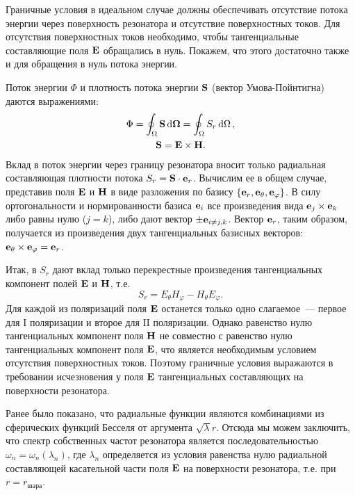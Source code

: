 \documentclass[12pt,a4paper]{article}
\begin{document}
        Граничные условия в идеальном случае должны обеспечивать отсутствие потока энергии через поверхность резонатора и отсутствие поверхностных токов. Для отсутствия поверхностных токов необходимо, чтобы тангенциальные составляющие поля $\vb{E}$ обращались в нуль. Покажем, что этого достаточно также и для обращения в нуль потока энергии.

        Поток энергии $\Phi$ и плотность потока энергии $\vb{S}$ (вектор Умова-Пойнтигна) даются выражениями:
        \begin{equation}\begin{gathered}
            \Phi = \oint_\Omega \vb{S} \dd{\vb{\Omega}}
                 = \oint_\Omega S_r \dd{\Omega} , \\
            \vb{S} = \vb{E} \times \vb{H} .
        \end{gathered}\end{equation}
        Вклад в поток энергии через границу резонатора вносит только радиальная составляющая плотности потока $S_r = \vb{S} \cdot \vb{e}_r$. Вычислим ее в общем случае, представив поля $\vb{E}$ и $\vb{H}$ в виде разложения по базису $\qty{ \vb{e}_r, \vb{e}_\theta, \vb{e}_\varphi }$. В силу ортогональности и нормированности базиса $\vb{e}_i$ все произведения вида $\vb{e}_j \times \vb{e}_k$ либо равны нулю ($j = k$), либо дают вектор $\pm \vb{e}_{i \neq j,k}$. Вектор $\vb{e}_r$, таким образом, получается из произведения двух тангенциальных базисных векторов: $\vb{e}_\theta \times \vb{e}_\varphi = \vb{e}_r$.

        Итак, в $S_r$ дают вклад только перекрестные произведения тангенциальных компонент полей $\vb{E}$ и $\vb{H}$, т.е.
        \begin{equation}
            S_r = E_\theta H_\varphi - H_\theta E_\varphi .
        \end{equation}
        Для каждой из поляризаций поля $\vb{E}$ останется только одно слагаемое~--- первое для $\mathrm{I}$ поляризации и второе для $\mathrm{II}$ поляризации. Однако равенство нулю тангенциальных компонент поля $\vb{H}$ не совместно с равенство нулю тангенциальных компонент поля $\vb{E}$, что является необходимым условием отсутствия поверхностных токов. Поэтому граничные условия выражаются в требовании исчезновения у поля $\vb{E}$ тангенциальных составляющих на поверхности резонатора.

        Ранее было показано, что радиальные функции являются комбинациями из сферических функций Бесселя от аргумента $\sqrt\lambda r$. Отсюда мы можем заключить, что спектр собственных частот резонатора является последовательностью $\omega_n = \omega_n(\lambda_n)$, где $\lambda_n$ определяется из условия равенства нулю радиальной составляющей касательной части поля $\vb{E}$ на поверхности резонатора, т.е. при $r = r_\text{шара}$.


    \nocite{*}
    
    
\end{document}
